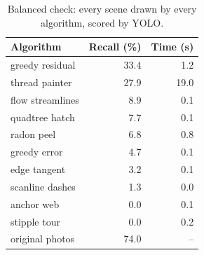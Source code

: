 \begin{table}[t]
\centering
\caption{Balanced check: every scene drawn by every algorithm, scored by YOLO.}
\label{tab:balanced}
\footnotesize
\begin{tabular}{lrr}
\toprule
Algorithm & Recall (\%) & Time (s) \\
\midrule
greedy residual & 33.4 & 1.2 \\
thread painter & 27.9 & 19.0 \\
flow streamlines & 8.9 & 0.1 \\
quadtree hatch & 7.7 & 0.1 \\
radon peel & 6.8 & 0.8 \\
greedy error & 4.7 & 0.1 \\
edge tangent & 3.2 & 0.1 \\
scanline dashes & 1.3 & 0.0 \\
anchor web & 0.0 & 0.1 \\
stipple tour & 0.0 & 0.2 \\
\midrule
original photos & 74.0 & -- \\
\bottomrule
\end{tabular}
\end{table}
